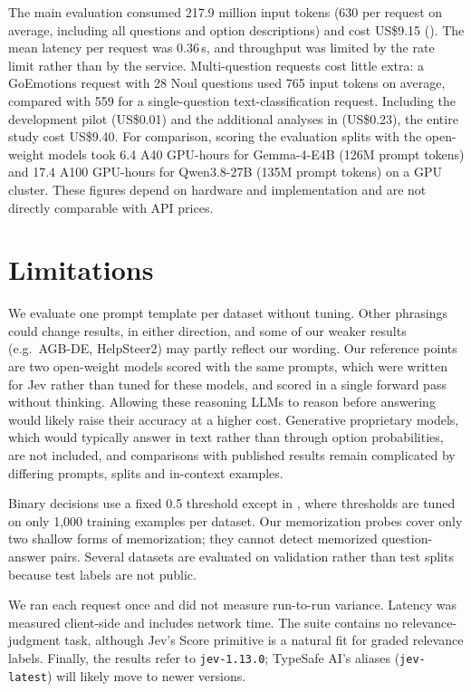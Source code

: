 \documentclass[table]{article}
\begin{document}
The main evaluation consumed 217.9 million input tokens (630 per request on average, including all questions and option descriptions) and cost US\$9.15 (). The mean latency per request was 0.36\,s, and throughput was limited by the rate limit rather than by the service. Multi-question requests cost little extra: a GoEmotions request with 28 Noul questions used 765 input tokens on average, compared with 559 for a single-question text-classification request. Including the development pilot (US\$0.01) and the additional analyses in  (US\$0.23), the entire study cost US\$9.40. For comparison, scoring the evaluation splits with the open-weight models took 6.4 A40 GPU-hours for Gemma-4-E4B (126M prompt tokens) and 17.4 A100 GPU-hours for Qwen3.8-27B (135M prompt tokens) on a GPU cluster. These figures depend on hardware and implementation and are not directly comparable with API prices.


\section{Limitations}

We evaluate one prompt template per dataset without tuning. Other phrasings could change results, in either direction, and some of our weaker results (e.g.\ AGB-DE, HelpSteer2) may partly reflect our wording. Our reference points are two open-weight models scored with the same prompts, which were written for Jev rather than tuned for these models, and scored in a single forward pass without thinking. Allowing these reasoning LLMs to reason before answering would likely raise their accuracy at a higher cost. Generative proprietary models, which would typically answer in text rather than through option probabilities, are not included, and comparisons with published results remain complicated by differing prompts, splits and in-context examples. 

Binary decisions use a fixed 0.5 threshold except in , where thresholds are tuned on only 1{,}000 training examples per dataset. Our memorization probes cover only two shallow forms of memorization; they cannot detect memorized question-answer pairs. Several datasets are evaluated on validation rather than test splits because test labels are not public. 

We ran each request once and did not measure run-to-run variance. Latency was measured client-side and includes network time. The suite contains no relevance-judgment task, although Jev's Score primitive is a natural fit for graded relevance labels. Finally, the results refer to \texttt{jev-1.13.0}; TypeSafe AI's aliases (\texttt{jev-latest}) will likely move to newer versions.
\end{document}
